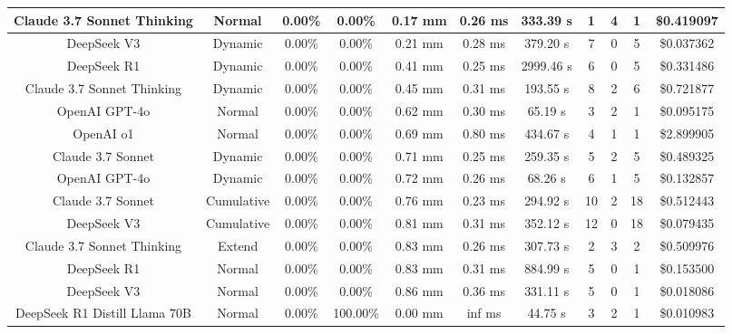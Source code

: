 \begin{table}[H]
\begin{center}
\begin{tabular}{|c|c|c|c|c|c|c|c|c|c|c|}
    \hline
    Claude 3.7 Sonnet Thinking & Normal & 0.00\% & 0.00\% & 0.17 mm & 0.26 ms & 333.39 s & 1 & 4 & 1 & \$0.419097 \\
    \hline
    DeepSeek V3 & Dynamic & 0.00\% & 0.00\% & 0.21 mm & 0.28 ms & 379.20 s & 7 & 0 & 5 & \$0.037362 \\
    \hline
    DeepSeek R1 & Dynamic & 0.00\% & 0.00\% & 0.41 mm & 0.25 ms & 2999.46 s & 6 & 0 & 5 & \$0.331486 \\
    \hline
    Claude 3.7 Sonnet Thinking & Dynamic & 0.00\% & 0.00\% & 0.45 mm & 0.31 ms & 193.55 s & 8 & 2 & 6 & \$0.721877 \\
    \hline
    OpenAI GPT-4o & Normal & 0.00\% & 0.00\% & 0.62 mm & 0.30 ms & 65.19 s & 3 & 2 & 1 & \$0.095175 \\
    \hline
    OpenAI o1 & Normal & 0.00\% & 0.00\% & 0.69 mm & 0.80 ms & 434.67 s & 4 & 1 & 1 & \$2.899905 \\
    \hline
    Claude 3.7 Sonnet & Dynamic & 0.00\% & 0.00\% & 0.71 mm & 0.25 ms & 259.35 s & 5 & 2 & 5 & \$0.489325 \\
    \hline
    OpenAI GPT-4o & Dynamic & 0.00\% & 0.00\% & 0.72 mm & 0.26 ms & 68.26 s & 6 & 1 & 5 & \$0.132857 \\
    \hline
    Claude 3.7 Sonnet & Cumulative & 0.00\% & 0.00\% & 0.76 mm & 0.23 ms & 294.92 s & 10 & 2 & 18 & \$0.512443 \\
    \hline
    DeepSeek V3 & Cumulative & 0.00\% & 0.00\% & 0.81 mm & 0.31 ms & 352.12 s & 12 & 0 & 18 & \$0.079435 \\
    \hline
    Claude 3.7 Sonnet Thinking & Extend & 0.00\% & 0.00\% & 0.83 mm & 0.26 ms & 307.73 s & 2 & 3 & 2 & \$0.509976 \\
    \hline
    DeepSeek R1 & Normal & 0.00\% & 0.00\% & 0.83 mm & 0.31 ms & 884.99 s & 5 & 0 & 1 & \$0.153500 \\
    \hline
    DeepSeek V3 & Normal & 0.00\% & 0.00\% & 0.86 mm & 0.36 ms & 331.11 s & 5 & 0 & 1 & \$0.018086 \\
    \hline
    DeepSeek R1 Distill Llama 70B & Normal & 0.00\% & 100.00\% & 0.00 mm & inf ms & 44.75 s & 3 & 2 & 1 & \$0.010983 \\
    \hline
\end{tabular}
\label{Results-Position-1-5}
\end{center}
\end{table}

